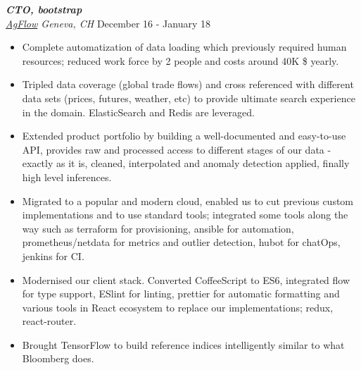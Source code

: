 \documentclass[line, margin]{res}
\begin{document}
\begin{resume}
{\sl \textbf{CTO, bootstrap} \\ \href{http://www.agflow.com}{AgFlow} Geneva, CH} \hfill December 16 - January 18 \\
\vspace{-0.3cm}
\begin{itemize}
  \item Complete automatization of data loading which previously required human resources; reduced work force by 2 people and costs around 40K \$ yearly.
  \item Tripled data coverage (global trade flows) and cross referenced with different data sets (prices, futures, weather, etc) to  provide ultimate search experience in the domain. ElasticSearch and Redis are leveraged.
  \item Extended product portfolio by building a well-documented and easy-to-use API, provides raw and processed access to different stages of our data - exactly as it is, cleaned, interpolated and anomaly detection applied, finally high level inferences.
  \item Migrated to a popular and modern cloud, enabled us to cut previous custom implementations and to use standard tools; integrated some tools along the way such as terraform for provisioning, ansible for automation, prometheus/netdata for metrics and outlier detection, hubot for chatOps, jenkins for CI.
  \item Modernised our client stack. Converted CoffeeScript to ES6, integrated flow for type support, ESlint for linting,  prettier for automatic formatting and various tools in React ecosystem to replace our implementations; redux, react-router.
  \item Brought TensorFlow to build reference indices intelligently similar to   what Bloomberg does.
\end{itemize}


\end{resume}
\end{document}
